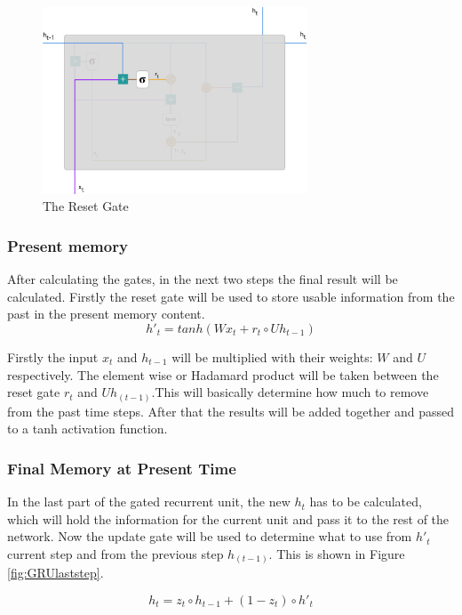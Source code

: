 \begin{figure}[htp]
	\centering
	\includegraphics[width=0.7\textwidth]{Illustrations/GRUresetgate.png}
	\caption{The Reset Gate}
	\label{fig:GRUresetgate}
\end{figure}

\newpage
\subsubsection{Present memory}
After calculating the gates, in the next two steps the final result will be calculated.
Firstly the reset gate will be used to store usable information from the past in the present memory content.
\begin{equation}
h'_t=tanh(Wx_t+r_t \circ Uh_{t-1})
\end{equation}

Firstly the input $x_t$ and $h_{t-1}$ will be multiplied with their weights: $W$ and $U$ respectively. The element wise or Hadamard product will be taken between the reset gate $r_t$ and $Uh_{(t-1)}$.This will basically determine how much to remove from the past time steps. After that the results will be added together and passed to a tanh activation function.
\newpage
\subsubsection{Final Memory at Present Time}
In the last part of the gated recurrent unit, the new $h_t$ has to be calculated, which will hold the information for the current unit and pass it to the rest of the network.
Now the update gate will be used to determine what to use from $h'_t$ current step and from the previous step $h_{(t-1)}$. This is shown in Figure \ref{fig:GRUlaststep}.

\begin{equation}
h_t=z_t \circ h_{t-1}+(1-z_t) \circ h'_t
\end{equation}


